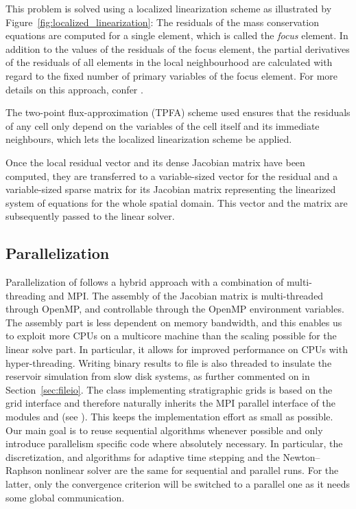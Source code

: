 This problem is solved using a
localized linearization scheme as illustrated by
Figure~\ref{fig:localized_linearization}: The residuals of the mass
conservation equations are computed for a single element, which is
called the \textit{focus} element. In addition to the values of the
residuals of the focus element, the partial derivatives of the
residuals of all elements in the local neighbourhood are calculated with
regard to the fixed number of primary variables of the focus element.
For more details on this approach, confer \cite{lauser2018local}.

The two-point flux-approximation (TPFA) scheme used ensures that the residuals of any
cell only depend on the variables of the cell itself and its immediate
neighbours, which lets the localized linearization scheme be applied.

Once the local residual vector and its dense Jacobian matrix have been
computed, they are transferred to a variable-sized vector for the
residual and a variable-sized sparse matrix for its Jacobian matrix
representing the linearized system of equations for the whole
spatial domain. This vector and the matrix are subsequently passed to
the linear solver.

\subsection{Parallelization}
\label{sec:parallelization}

Parallelization of \opmflow follows a hybrid approach with a combination of 
multi-threading and MPI. The assembly of the Jacobian matrix
is multi-threaded through OpenMP, and controllable through the OpenMP 
environment variables. The assembly part is less dependent on 
memory bandwidth, and this enables us to exploit more CPUs on a multicore 
machine than the scaling possible for the linear solve part. In particular, 
it allows for improved performance on CPUs with hyper-threading. Writing binary
results to file is also threaded to insulate the reservoir 
simulation from slow disk systems, as further commented on in Section~\ref{sec:fileio}. 
The  class implementing stratigraphic grids is based on the \dune
grid interface and \opmflow therefore naturally inherits
the MPI parallel interface of the \dune modules \dunegrid and \duneistl (see
\cite{dunepaperI:08,dunepaperII:08,ISTLParallel}). This keeps the implementation effort
as small as possible. Our main goal is to reuse
sequential algorithms whenever possible and only introduce parallelism specific code
where absolutely necessary. In particular, the discretization, and algorithms for 
adaptive time stepping and the Newton--Raphson nonlinear solver are the
same for sequential and parallel runs. For the latter, only the
convergence criterion will be switched to a parallel one as it needs
some global communication.

